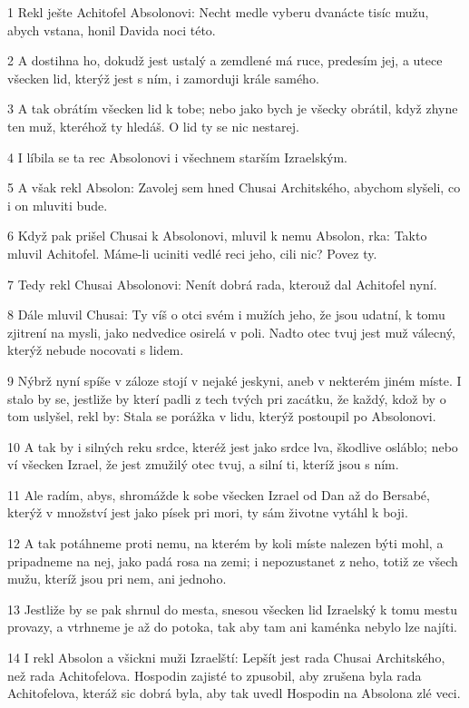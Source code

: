 \par 1 Rekl ješte Achitofel Absolonovi: Necht medle vyberu dvanácte tisíc mužu, abych vstana, honil Davida noci této.
\par 2 A dostihna ho, dokudž jest ustalý a zemdlené má ruce, predesím jej, a utece všecken lid, kterýž jest s ním, i zamorduji krále samého.
\par 3 A tak obrátím všecken lid k tobe; nebo jako bych je všecky obrátil, když zhyne ten muž, kteréhož ty hledáš. O lid ty se nic nestarej.
\par 4 I líbila se ta rec Absolonovi i všechnem starším Izraelským.
\par 5 A však rekl Absolon: Zavolej sem hned Chusai Architského, abychom slyšeli, co i on mluviti bude.
\par 6 Když pak prišel Chusai k Absolonovi, mluvil k nemu Absolon, rka: Takto mluvil Achitofel. Máme-li uciniti vedlé reci jeho, cili nic? Povez ty.
\par 7 Tedy rekl Chusai Absolonovi: Nenít dobrá rada, kterouž dal Achitofel nyní.
\par 8 Dále mluvil Chusai: Ty víš o otci svém i mužích jeho, že jsou udatní, k tomu zjitrení na mysli, jako nedvedice osirelá v poli. Nadto otec tvuj jest muž válecný, kterýž nebude nocovati s lidem.
\par 9 Nýbrž nyní spíše v záloze stojí v nejaké jeskyni, aneb v nekterém jiném míste. I stalo by se, jestliže by kterí padli z tech tvých pri zacátku, že každý, kdož by o tom uslyšel, rekl by: Stala se porážka v lidu, kterýž postoupil po Absolonovi.
\par 10 A tak by i silných reku srdce, kteréž jest jako srdce lva, škodlive osláblo; nebo ví všecken Izrael, že jest zmužilý otec tvuj, a silní ti, kteríž jsou s ním.
\par 11 Ale radím, abys, shromážde k sobe všecken Izrael od Dan až do Bersabé, kterýž v množství jest jako písek pri mori, ty sám životne vytáhl k boji.
\par 12 A tak potáhneme proti nemu, na kterém by koli míste nalezen býti mohl, a pripadneme na nej, jako padá rosa na zemi; i nepozustanet z neho, totiž ze všech mužu, kteríž jsou pri nem, ani jednoho.
\par 13 Jestliže by se pak shrnul do mesta, snesou všecken lid Izraelský k tomu mestu provazy, a vtrhneme je až do potoka, tak aby tam ani kaménka nebylo lze najíti.
\par 14 I rekl Absolon a všickni muži Izraelští: Lepšít jest rada Chusai Architského, než rada Achitofelova. Hospodin zajisté to zpusobil, aby zrušena byla rada Achitofelova, kteráž sic dobrá byla, aby tak uvedl Hospodin na Absolona zlé veci.
